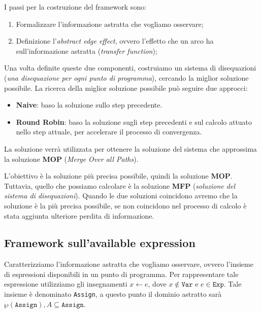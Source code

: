 I passi per la costruzione del framework sono:
\begin{enumerate}
    \item Formalizzare l'informazione astratta che vogliamo osservare;
    \item Definizione l'\textit{abstract edge effect}, ovvero l'effetto che un arco ha sull'informazione astratta 
    (\textit{transfer function});
\end{enumerate}
Una volta definite queste due componenti, costruiamo un sistema di disequazioni (\textit{una 
disequazione per ogni punto di programma}), cercando la miglior soluzione possibile. La 
ricerca della miglior soluzione possibile può seguire due approcci:
\begin{itemize}
    \item \textbf{Naive}: baso la soluzione sullo step precedente.
    \item \textbf{Round Robin}: baso la soluzione sugli step precedenti e sul calcolo attuato nello step attuale,
    per accelerare il processo di convergenza.
\end{itemize}
La soluzione  verrà utilizzata per ottenere la soluzione del sistema che approssima
la soluzione \textbf{MOP} (\textit{Merge 
Over all Paths}).

L'obiettivo è la soluzione più precisa possibile, quindi la soluzione \textbf{MOP}. Tuttavia, quello che possiamo 
calcolare è la soluzione \textbf{MFP} (\textit{soluzione del sistema di disequazioni}). Quando le due soluzioni 
coincidono avremo che la soluzione è la più precisa possibile, se non coincidono nel processo di calcolo è 
stata aggiunta ulteriore perdita di informazione.

\subsection{Framework sull'available expression}
Caratterizziamo l'informazione astratta che vogliamo osservare, ovvero l'insieme di espressioni disponibili 
in un punto di programma. Per rappresentare tale espressione utilizziamo gli insegnamenti $x \gets e$, dove 
$x \notin \texttt{Var}$ e $e \in \texttt{Exp}$. Tale insieme è denominato \texttt{Assign}, a questo punto il dominio 
astratto sarà $\wp(\texttt{Assign}), A \subseteq \texttt{Assign}$.

